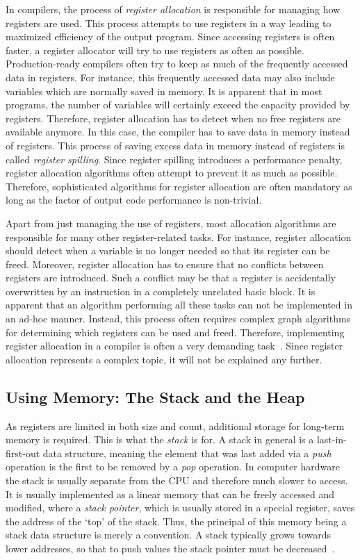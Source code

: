 In compilers, the process of \emph{register allocation} is responsible for managing how registers are used.
This process attempts to use registers in a way leading to maximized efficiency of the output program.
Since accessing registers is often faster, a register allocator will try to use registers as often as possible.
Production-ready compilers often try to keep as much of the frequently accessed data in registers.
For instance, this frequently accessed data may also include variables which are normally saved in memory.
It is apparent that in most programs, the number of variables will certainly exceed the capacity provided by registers.
Therefore, register allocation has to detect when no free registers are available anymore.
In this case, the compiler has to save data in memory instead of registers.
This process of saving excess data in memory instead of registers is called \emph{register spilling}.
Since register spilling introduces a performance penalty, register allocation algorithms often attempt to prevent it as much as possible.
Therefore, sophisticated algorithms for register allocation are often mandatory as long as the factor of output code performance is non-trivial.

Apart from just managing the use of registers, most allocation algorithms are responsible for many other register-related tasks.
For instance, register allocation should detect when a variable is no longer needed so that its register can be freed.
Moreover, register allocation has to ensure that no conflicts between registers are introduced.
Such a conflict may be that a register is accidentally overwritten by an instruction in a completely unrelated basic block.
It is apparent that an algorithm performing all these tasks can not be implemented in an ad-hoc manner.
Instead, this process often requires complex graph algorithms for determining which registers can be used and freed.
Therefore, implementing register allocation in a compiler is often a very demanding task~\cite[pp.212-214]{Watson2017}.
Since register allocation represents a complex topic, it will not be explained any further.

\subsection{Using Memory: The Stack and the Heap}

As registers are limited in both size and count, additional storage for long-term memory is required.
This is what the \emph{stack} is for.
A stack in general is a last-in-first-out data structure, meaning the element that was last added via a \emph{push} operation is the first to be removed by a \emph{pop} operation.
In computer hardware the stack is usually separate from the CPU and therefore much slower to access.
It is usually implemented as a linear memory that can be freely accessed and modified, where a \emph{stack pointer}, which is usually stored in a special register, saves the address of the `top' of the stack.
Thus, the principal of this memory being a stack data structure is merely a convention.
A stack typically grows towards lower addresses, so that to push values the stack pointer must be decreased~\cite[pp.~68,99,100]{Patterson2017-zq}.

